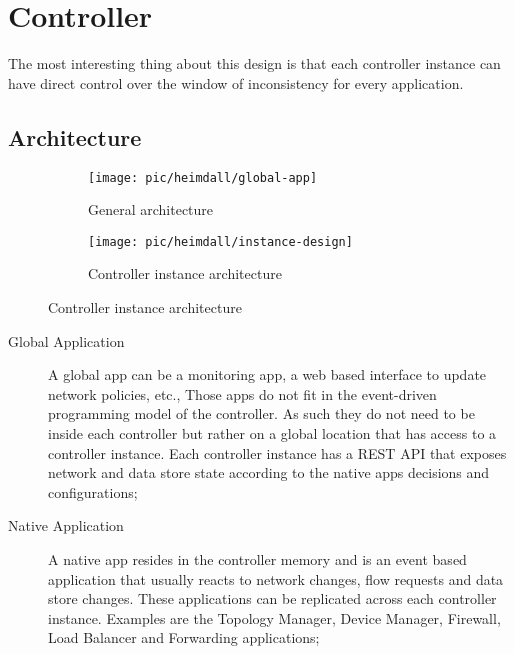 \documentclass[12pt,openright,twoside]{report}
\title{\PEITITULO}
\author{\PEIAutor}
\begin{document}


\section{Controller}
The most interesting thing about this design is that each controller instance can have direct control over the window of inconsistency for every application. 
\subsection{Architecture}

\begin{figure}[ht]
  \centering
  \begin{subfigure}[b]{0.4\textwidth}
                \centering
                \texttt{[image: pic/heimdall/global-app]}
                \caption{General architecture}
        \end{subfigure}%

        \begin{subfigure}[b]{0.7\textwidth}
                \centering
                \texttt{[image: pic/heimdall/instance-design]}
                \caption{Controller instance architecture}
        \end{subfigure}
\end{figure}



\begin{description}
\item[Global Application] A global app can be a monitoring app, a web based interface to update network policies, etc., Those apps do not fit in the event-driven programming  model of the controller.  As such they do not need to be inside each controller but rather on a global location that has access to a controller instance. Each controller instance has a REST API that exposes network and data store state according to the native apps decisions and configurations;
\item[Native Application] A native app resides in the controller memory and is an event based application that usually reacts to network changes, flow requests and data store changes. These applications can be replicated across each controller instance. Examples are the Topology Manager, Device Manager, Firewall, Load Balancer and Forwarding applications; 
\end{description} 

\noindent\makebox[\textwidth]{\rule{\paperwidth}{0.4pt}}
\end{document}
